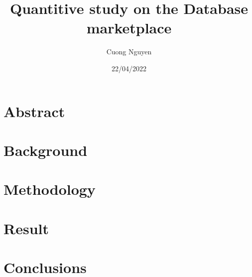 \documentclass{article}
\title{Quantitive study on the Database marketplace}
\author{Cuong Nguyen}
\date{22/04/2022}
\begin{document}
    
\maketitle

\tableofcontents

\section{Abstract}\label{sec:abstract}

\section{Background}\label{sec:background}

\section{Methodology}\label{sec:method}

\section{Result}\label{sec:result}

\section{Conclusions}\label{sec:conclusion}
\end{document}

